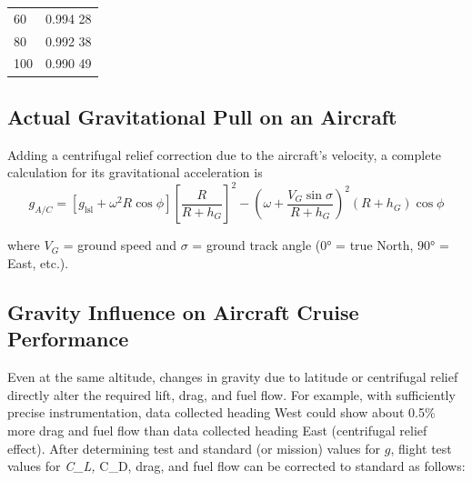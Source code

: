 \documentclass[
]{book}
\begin{document}
\begin{longtable}[]{@{}ll@{}}
\begin{minipage}[t]{0.16\columnwidth}\raggedright
60\strut
\end{minipage} & \begin{minipage}[t]{0.26\columnwidth}\raggedright
0.994 28\strut
\end{minipage}\tabularnewline
\begin{minipage}[t]{0.16\columnwidth}\raggedright
80\strut
\end{minipage} & \begin{minipage}[t]{0.26\columnwidth}\raggedright
0.992 38\strut
\end{minipage}\tabularnewline
\begin{minipage}[t]{0.16\columnwidth}\raggedright
100\strut
\end{minipage} & \begin{minipage}[t]{0.26\columnwidth}\raggedright
0.990 49\strut
\end{minipage}\tabularnewline
\bottomrule
\end{longtable}

\hypertarget{actual-gravitational-pull-on-an-aircraft}{%
\subsection*{Actual Gravitational Pull on an Aircraft}\label{actual-gravitational-pull-on-an-aircraft}}

Adding a centrifugal relief correction due to the aircraft's velocity, a complete calculation for its gravitational acceleration is
\[
g_{A/C} = \left[ g_{\mathrm{lsl}} + \omega^2 R \cos{\phi} \right] \left[ \frac{R}{R + h_G} \right]^2 - \left( \omega + \frac{V_G \sin{\sigma}}{R + h_G} \right)^2 \left(R + h_G\right) \cos{\phi}
\]

where \(V_G\) = ground speed and \(\sigma\) = ground track angle (\(0°\) = true North, \(90°\) = East, etc.).

\hypertarget{gravity-influence-on-aircraft-cruise-performance}{%
\subsection*{Gravity Influence on Aircraft Cruise Performance}\label{gravity-influence-on-aircraft-cruise-performance}}

Even at the same altitude, changes in gravity due to latitude or centrifugal relief directly alter the required lift, drag, and fuel flow. For example, with sufficiently precise instrumentation, data collected heading West could show about 0.5\% more drag and fuel flow than data collected heading East (centrifugal relief effect). After determining test and standard (or mission) values for \(g\), flight test values for \emph{C\_L, }C\_D, drag, and fuel flow can be corrected to standard as follows:
\end{document}
